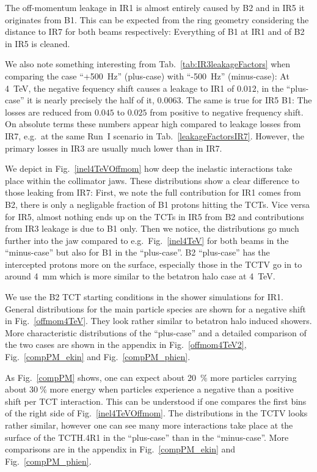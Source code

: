 The off-momentum leakage in IR1 is almost entirely caused by B2 and in IR5 it originates from B1. This can be expected from the ring geometry considering the distance to IR7 for both beams respectively: Everything of B1 at IR1 and of B2 in IR5 is cleaned. 

We also note something interesting from Tab.~\ref{tab:IR3leakageFactors} when comparing the case ``+500~Hz'' (plus-case) with ``-500~Hz'' (minus-case): At 4~TeV, the negative fequency shift causes a leakage to IR1 of $0.012$, in the ``plus-case'' it is nearly precisely the half of it, $0.0063$. The same is true for IR5 B1: The losses are reduced from $0.045$ to $0.025$ from positive to negative frequency shift. On absolute terms these numbers appear high compared to leakage losses from IR7, e.g.~at the same Run~I scenario in Tab.~\ref{leakageFactorsIR7}. However, the primary losses in IR3 are usually much lower than in IR7.

We depict in Fig.~\ref{inel4TeVOffmom} how deep the inelastic interactions take place within the collimator jaws. These distributions show a clear difference to those leaking from IR7: First, we note the full contribution for IR1 comes from B2, there is only a negligable fraction of B1 protons hitting the TCTs. Vice versa for IR5, almost nothing ends up on the TCTs in IR5 from B2 and contributions from IR3 leakage is due to B1 only. Then we notice, the distributions go much further into the jaw compared to e.g.~Fig.~\ref{inel4TeV} for both beams in the ``minus-case'' but also for B1 in the ``plus-case''. B2 ``plus-case'' has the intercepted protons more on the surface, especially those in the TCTV go in to around 4~mm which is more similar to the betatron halo case at 4~TeV. 

We use the B2 TCT starting conditions in the shower simulations for IR1. General distributions for the main particle species are shown for a negative shift in Fig.~\ref{offmom4TeV}. They look rather similar to betatron halo induced showers. More characteristic distributions of the ``plus-case'' and a detailed comparison of the two cases are shown in the appendix in Fig.~\ref{offmom4TeV2}, Fig.~\ref{compPM_ekin} and Fig.~\ref{compPM_phien}.

As Fig.~\ref{compPM} shows, one can expect about 20~$\%$ more particles carrying about 30$~\%$ more energy when particles experience a negative than a positive shift per TCT interaction. This can be understood if one compares the first bins of the right side of Fig.~\ref{inel4TeVOffmom}. The distributions in the TCTV looks rather similar, however one can see many more interactions take place at the surface of the TCTH.4R1 in the ``plus-case'' than in the ``minus-case''. More comparisons are in the appendix in Fig.~\ref{compPM_ekin} and Fig.~\ref{compPM_phien}.


